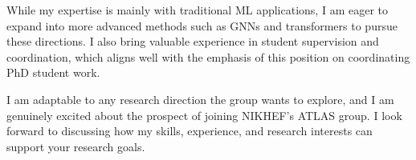 \documentclass[11pt, a4paper]{awesome-cv}
\begin{document}
\begin{cvletter}
  While my expertise is mainly with traditional ML applications, I am eager to expand into more advanced methods such as GNNs and transformers to pursue these directions. I also bring valuable experience in student supervision and coordination, which aligns well with the emphasis of this position on coordinating PhD student work.
  
  I am adaptable to any research direction the group wants to explore, and I am genuinely excited about the prospect of joining NIKHEF's ATLAS group. I look forward to discussing how my skills, experience, and research interests can support your research goals.

\end{cvletter}


\makeletterclosing
\end{document}
